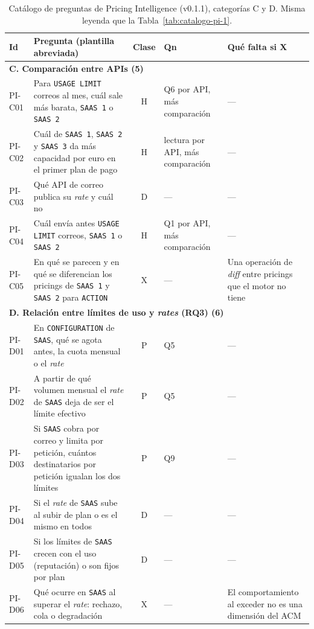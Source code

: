 \begin{table}[H]
\centering
\small
\begin{tabular}{|l|p{5.4cm}|c|p{2.3cm}|p{3.1cm}|}
\hline
\textbf{Id} & \textbf{Pregunta (plantilla abreviada)} & \textbf{Clase} &
\textbf{Qn} & \textbf{Qué falta si X} \\
\hline
\multicolumn{5}{|l|}{\textbf{C. Comparación entre APIs (5)}} \\
\hline
PI-C01 & Para \texttt{USAGE LIMIT} correos al mes, cuál sale más barata, \texttt{SAAS 1} o \texttt{SAAS 2} & H & Q6 por API, más comparación & --- \\
\hline
PI-C02 & Cuál de \texttt{SAAS 1}, \texttt{SAAS 2} y \texttt{SAAS 3} da más capacidad por euro en el primer plan de pago & H & lectura por API, más comparación & --- \\
\hline
PI-C03 & Qué API de correo publica su \textit{rate} y cuál no & D & --- & --- \\
\hline
PI-C04 & Cuál envía antes \texttt{USAGE LIMIT} correos, \texttt{SAAS 1} o \texttt{SAAS 2} & H & Q1 por API, más comparación & --- \\
\hline
PI-C05 & En qué se parecen y en qué se diferencian los pricings de \texttt{SAAS 1} y \texttt{SAAS 2} para \texttt{ACTION} & X & --- & Una operación de \textit{diff} entre pricings que el motor no tiene \\
\hline
\multicolumn{5}{|l|}{\textbf{D. Relación entre límites de uso y \textit{rates} (RQ3) (6)}} \\
\hline
PI-D01 & En \texttt{CONFIGURATION} de \texttt{SAAS}, qué se agota antes, la cuota mensual o el \textit{rate} & P & Q5 & --- \\
\hline
PI-D02 & A partir de qué volumen mensual el \textit{rate} de \texttt{SAAS} deja de ser el límite efectivo & P & Q5 & --- \\
\hline
PI-D03 & Si \texttt{SAAS} cobra por correo y limita por petición, cuántos destinatarios por petición igualan los dos límites & P & Q9 & --- \\
\hline
PI-D04 & Si el \textit{rate} de \texttt{SAAS} sube al subir de plan o es el mismo en todos & D & --- & --- \\
\hline
PI-D05 & Si los límites de \texttt{SAAS} crecen con el uso (reputación) o son fijos por plan & D & --- & --- \\
\hline
PI-D06 & Qué ocurre en \texttt{SAAS} al superar el \textit{rate}: rechazo, cola o degradación & X & --- & El comportamiento al exceder no es una dimensión del ACM \\
\hline
\end{tabular}
\caption{Catálogo de preguntas de Pricing Intelligence (v0.1.1), categorías C y D. Misma
leyenda que la Tabla~\ref{tab:catalogo-pi-1}.}
\label{tab:catalogo-pi-2}
\end{table}

